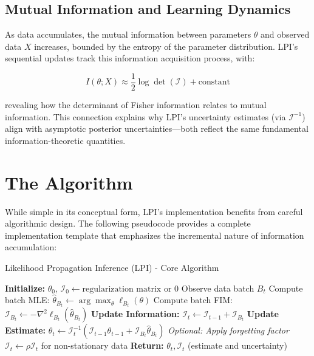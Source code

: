 \documentclass[11pt]{article}
\begin{document}
\subsection{Mutual Information and Learning Dynamics}
As data accumulates, the mutual information between parameters $\theta$ and observed data $X$ increases, bounded by the entropy of the parameter distribution. LPI's sequential updates track this information acquisition process, with:

\begin{equation}
I(\theta; X) \approx \frac{1}{2}\log\det(\mathcal{I}) + \text{constant}
\end{equation}

revealing how the determinant of Fisher information relates to mutual information. This connection explains why LPI's uncertainty estimates (via $\mathcal{I}^{-1}$) align with asymptotic posterior uncertainties---both reflect the same fundamental information-theoretic quantities.

\section{The Algorithm}
While simple in its conceptual form, LPI's implementation benefits from careful algorithmic design. The following pseudocode provides a complete implementation template that emphasizes the incremental nature of information accumulation:

\begin{algorithm}
\caption{Likelihood Propagation Inference (LPI) - Core Algorithm}
\label{alg:core_lpi_algorithm}
\begin{algorithmic}[1]
\State \textbf{Initialize:} $\theta_0$, $\mathcal{I}_0 \gets \text{regularization matrix or } 0$
 \State Observe data batch $B_t$
 \State Compute batch MLE: $\hat{\theta}_{B_t} \gets \arg\max_{\theta} \ell_{B_t}(\theta)$
 \State Compute batch FIM: $\mathcal{I}_{B_t} \gets -\nabla^2 \ell_{B_t}(\hat{\theta}_{B_t})$
 \State \textbf{Update Information:} $\mathcal{I}_t \gets \mathcal{I}_{t-1} + \mathcal{I}_{B_t}$
 \State \textbf{Update Estimate:} $\theta_t \gets \mathcal{I}_t^{-1}(\mathcal{I}_{t-1}\theta_{t-1} + \mathcal{I}_{B_t}\hat{\theta}_{B_t})$
 \State \textit{Optional: Apply forgetting factor} $\mathcal{I}_t \gets \rho \mathcal{I}_t$ for non-stationary data
\EndFor
\State \textbf{Return:} $\theta_t, \mathcal{I}_t$ (estimate and uncertainty)
\end{algorithmic}
\end{algorithm}
\end{document}

